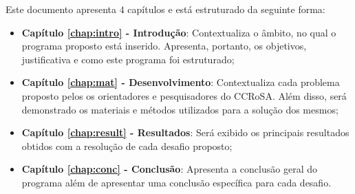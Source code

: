Este documento apresenta $4$ capítulos e está estruturado da seguinte forma:

\begin{itemize}

  \item \textbf{Capítulo \ref{chap:intro} - Introdução}: Contextualiza o âmbito, no qual o programa proposto está inserido. Apresenta, portanto, os objetivos, justificativa e como este programa foi estruturado;
  \item \textbf{Capítulo \ref{chap:mat} - Desenvolvimento}: Contextualiza cada problema proposto pelos os orientadores e pesquisadores do CCRoSA. Além disso, será demonstrado os materiais e métodos utilizados para a solução dos mesmos;
  \item \textbf{Capítulo \ref{chap:result} - Resultados}: Será exibido os principais resultados obtidos com a resolução de cada desafio proposto;
  \item \textbf{Capítulo \ref{chap:conc} - Conclusão}: Apresenta a conclusão geral do programa além de apresentar uma conclusão específica para cada desafio.

\end{itemize}
